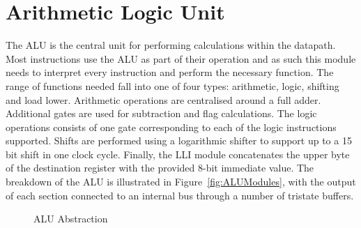 

\section{Arithmetic Logic Unit}\label{sect:design:alu}

The ALU is the central unit for performing calculations within the datapath. 
Most instructions use the ALU as part of their operation and as such this module needs to interpret every instruction and perform the necessary function. 
The range of functions needed fall into one of four types: arithmetic, logic, shifting and load lower. 
Arithmetic operations are centralised around a full adder.
Additional gates are used for subtraction and flag calculations. %
The logic operations consists of one gate corresponding to each of the logic instructions supported. 
Shifts are performed using a logarithmic shifter to support up to a 15 bit shift in one clock cycle. 
Finally, the LLI module concatenates the upper byte of the destination register with the provided 8-bit immediate value. 
The breakdown of the ALU is illustrated in Figure~\ref{fig:ALUModules}, with the output of each section connected to an internal bus through a number of tristate buffers. 

\begin{figure}[h]
	\centering
	\caption{ALU Abstraction}
	\label{fig:ALUAbsract}
\end{figure}

